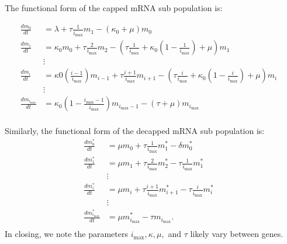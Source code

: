 \documentclass[a4,center,fleqn]{NAR}
\newcommand{\imax}{\ensuremath{{i_{\max}}}\xspace}
\begin{document}
The functional form of the capped mRNA sub population is:
\pagebreak 
\begin{strip}
\begin{align} \label{eq:Capped_ODE}
\frac{dm_{0}}{dt} &= \lambda+ \tau \frac{1}{\imax}m_{1}-\left(\kappa_0 + \mu\right)m_{0} \\ \nonumber
\frac{dm_{1}}{dt} &= \kappa_0 m_{0}+ \tau \frac{2}{\imax}m_{2}-\left( \tau \frac{1}{\imax}+\kappa_0\left(1-\frac{1}{\imax}\right)+\mu\right) m_{1}\\ \nonumber
& \vdots & \\ \nonumber
\frac{dm_{i}}{dt} &= \kappa0 \left(\frac{i-1}{\imax}\right) m_{i-1}+ \tau \frac{i+1}{\imax}m_{i+1}-\left( \tau \frac{i}{\imax}+\kappa_0\left(1-\frac{i}{\imax}\right)+\mu\right) m_{i} \\ \nonumber
& \vdots & \\ \nonumber
\frac{dm_{\imax}}{dt} &= \kappa_0\left(1-\frac{\imax-1}{\imax}\right)m_{\imax-1}-\left( \tau +\mu\right) m_{\imax}\\ \nonumber
\end{align}
\end{strip}
Similarly, the functional form of the decapped mRNA sub population is: 
\begin{align}\label{eq:Decapped_ODE}
\frac{dm_{0}^{*}}{dt} &= \mu m_{0}+ \tau \frac{1}{\imax}m_{1}^{*}-\delta m_{0}^{*} \\ \nonumber
\frac{dm_{1}^{*}}{dt} &= \mu m_{1}+ \tau \frac{2}{\imax}m_{2}^{*}-\tau \frac{1}{\imax} m_{1}^{*} \\ \nonumber
& \vdots & \\ \nonumber
\frac{dm_{i}^{*}}{dt} &= \mu m_{i}+ \tau \frac{i+1}{\imax}m_{i+1}^{*}-\tau \frac{i}{\imax} m_{i}^{*} \\ \nonumber
& \vdots & \\ \nonumber
\frac{dm_{\imax}^{*}}{dt} &= \mu m_{\imax}^{*}- \tau m_{\imax}. \\ \nonumber
\end{align}
In closing, we note the parameters $\imax, \kappa, \mu,$ and $\tau$ likely vary between genes.
\end{document}
